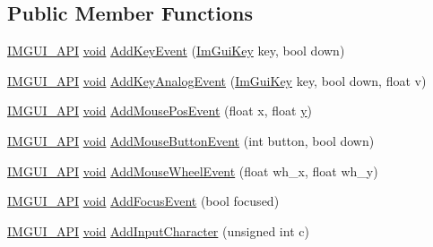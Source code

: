 \subsection*{Public Member Functions}
\begin{DoxyCompactItemize}
\item 
\hyperlink{imgui_8h_a43829975e84e45d1149597467a14bbf5}{I\+M\+G\+U\+I\+\_\+\+A\+PI} \hyperlink{imgui__impl__opengl3__loader_8h_ac668e7cffd9e2e9cfee428b9b2f34fa7}{void} \hyperlink{structImGuiIO_a50c3ab6883647aacdf5153a4dbe2cdbe}{Add\+Key\+Event} (\hyperlink{imgui_8h_aa22ffe36b188427d712447ec465203d4}{Im\+Gui\+Key} key, bool down)
\item 
\hyperlink{imgui_8h_a43829975e84e45d1149597467a14bbf5}{I\+M\+G\+U\+I\+\_\+\+A\+PI} \hyperlink{imgui__impl__opengl3__loader_8h_ac668e7cffd9e2e9cfee428b9b2f34fa7}{void} \hyperlink{structImGuiIO_ac88dcffd1c6785d00eedd5616315e48c}{Add\+Key\+Analog\+Event} (\hyperlink{imgui_8h_aa22ffe36b188427d712447ec465203d4}{Im\+Gui\+Key} key, bool down, float v)
\item 
\hyperlink{imgui_8h_a43829975e84e45d1149597467a14bbf5}{I\+M\+G\+U\+I\+\_\+\+A\+PI} \hyperlink{imgui__impl__opengl3__loader_8h_ac668e7cffd9e2e9cfee428b9b2f34fa7}{void} \hyperlink{structImGuiIO_ab6423058bbb3503c3cf66e0e45ee606d}{Add\+Mouse\+Pos\+Event} (float x, float \hyperlink{imgui__impl__opengl3__loader_8h_a5e247fc24ceb70d83f6ad59149b8910a}{y})
\item 
\hyperlink{imgui_8h_a43829975e84e45d1149597467a14bbf5}{I\+M\+G\+U\+I\+\_\+\+A\+PI} \hyperlink{imgui__impl__opengl3__loader_8h_ac668e7cffd9e2e9cfee428b9b2f34fa7}{void} \hyperlink{structImGuiIO_a9fa5df74047424bb03d7cb29c6fb6ea1}{Add\+Mouse\+Button\+Event} (int button, bool down)
\item 
\hyperlink{imgui_8h_a43829975e84e45d1149597467a14bbf5}{I\+M\+G\+U\+I\+\_\+\+A\+PI} \hyperlink{imgui__impl__opengl3__loader_8h_ac668e7cffd9e2e9cfee428b9b2f34fa7}{void} \hyperlink{structImGuiIO_ad3b1a263e8a6e346dd1bef89ce3fb946}{Add\+Mouse\+Wheel\+Event} (float wh\+\_\+x, float wh\+\_\+y)
\item 
\hyperlink{imgui_8h_a43829975e84e45d1149597467a14bbf5}{I\+M\+G\+U\+I\+\_\+\+A\+PI} \hyperlink{imgui__impl__opengl3__loader_8h_ac668e7cffd9e2e9cfee428b9b2f34fa7}{void} \hyperlink{structImGuiIO_a051243815ff6305cdcd3db8f84c2dfef}{Add\+Focus\+Event} (bool focused)
\item 
\hyperlink{imgui_8h_a43829975e84e45d1149597467a14bbf5}{I\+M\+G\+U\+I\+\_\+\+A\+PI} \hyperlink{imgui__impl__opengl3__loader_8h_ac668e7cffd9e2e9cfee428b9b2f34fa7}{void} \hyperlink{structImGuiIO_a0ded7ab1043ea14b65e1d81819878ccc}{Add\+Input\+Character} (unsigned int c)

\end{DoxyCompactItemize}
